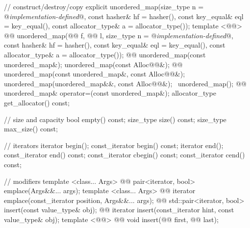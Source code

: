 \documentclass[american,twoside]{book}
\begin{document}
\begin{codeblock}
{{    // construct/destroy/copy
    explicit unordered_map(size_type n = @\textit{implementation-defined}@,
                           const hasher& hf = hasher(),
                           const key_equal& eql = key_equal(),
                           const allocator_type& a = allocator_type());
    template <@@>
      @@
      unordered_map(@@ f, @@ l,
                    size_type n = @\textit{implementation-defined}@,
                    const hasher& hf = hasher(),
                    const key_equal& eql = key_equal(),
                    const allocator_type& a = allocator_type());
    @@ 
      unordered_map(const unordered_map&);
    unordered_map(const Alloc@@&);
    @@ 
      unordered_map(const unordered_map&, const Alloc@@&);
    unordered_map(unordered_map&&, const Alloc@@&);
    ~unordered_map();
    @@
      unordered_map& operator=(const unordered_map&);
    allocator_type get_allocator() const;

    // size and capacity
    bool empty() const;
    size_type size() const;
    size_type max_size() const;

    // iterators
    iterator       begin();
    const_iterator begin() const;
    iterator       end();
    const_iterator end() const;
    const_iterator cbegin() const;
    const_iterator cend() const;

    // modifiers
    template <class... Args> 
      @@
      pair<iterator, bool> emplace(Args&&... args);
    template <class... Args> 
      @@
      iterator emplace(const_iterator position, Args&&... args);
    @@
      std::pair<iterator, bool> insert(const value_type& obj);
    @@
      iterator insert(const_iterator hint, const value_type& obj);
    template <@@> 
      @@
      void insert(@@ first, @@ last);

}}
\end{codeblock}
\end{document}
